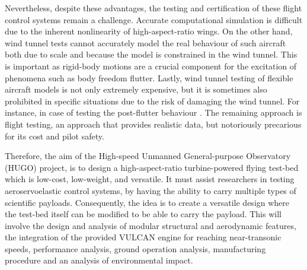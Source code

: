 Nevertheless, despite these advantages, the testing and certification of these flight control systems remain a challenge. Accurate computational simulation is difficult due to the inherent nonlinearity of high-aspect-ratio wings. On the other hand, wind tunnel tests cannot accurately model the real behaviour of such aircraft both due to scale and because the model is constrained in the wind tunnel. This is important as rigid-body motions are a crucial component for the excitation of phenomena such as body freedom flutter. Lastly, wind tunnel testing of flexible aircraft models is not only extremely expensive, but it is sometimes also prohibited in specific situations due to the risk of damaging the wind tunnel. For instance, in case of testing the post-flutter behaviour \cite{Castro2026}. The remaining approach is flight testing, an approach that provides realistic data, but notoriously precarious for its cost and pilot safety. 

Therefore, the aim of the High-speed Unmanned General-purpose Observatory (HUGO) project, is to design a high-aspect-ratio turbine-powered flying test-bed which is low-cost, low-weight, and versatile. It must assist researchers in testing aeroservoelastic control systems, by having the ability to carry multiple types of scientific payloads. Consequently, the idea is to create a versatile design where the test-bed itself can be modified to be able to carry the payload. This will involve the design and analysis of modular structural and aerodynamic features, the integration of the provided VULCAN engine for reaching near-transonic speeds, performance analysis, ground operation analysis, manufacturing procedure and an analysis of environmental impact.

